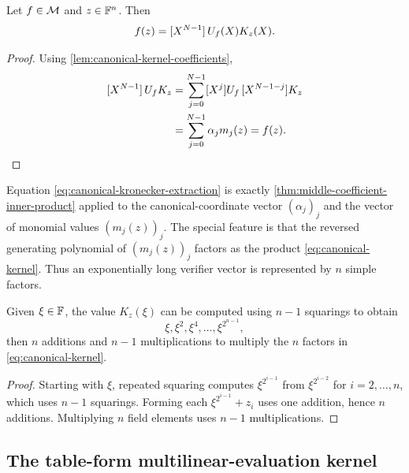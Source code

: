 \begin{theorem}
\label{thm:canonical-kronecker-extraction}
Let $f\in\mathcal{M}$ and $z\in\mathbb{F}^n$.  Then
\begin{equation}
  f(z)
  =[X^{N-1}]\,U_f(X)K_z(X).
  \label{eq:canonical-kronecker-extraction}
\end{equation}
\end{theorem}

\begin{proof}
Using \cref{lem:canonical-kernel-coefficients},
\begin{align*}
  [X^{N-1}]\,U_fK_z
  &=\sum_{j=0}^{N-1}[X^j]U_f\,[X^{N-1-j}]K_z\\
  &=\sum_{j=0}^{N-1}\alpha_jm_j(z)
   =f(z).
\end{align*}
\end{proof}

\begin{remark}
\label{rem:canonical-kernel-inner-product}
Equation \eqref{eq:canonical-kronecker-extraction} is exactly \cref{thm:middle-coefficient-inner-product} applied to the canonical-coordinate vector $(\alpha_j)_j$ and the vector of monomial values $(m_j(z))_j$.  The special feature is that the reversed generating polynomial of $(m_j(z))_j$ factors as the product \eqref{eq:canonical-kernel}.  Thus an exponentially long verifier vector is represented by $n$ simple factors.
\end{remark}

\begin{proposition}
\label{prop:canonical-kernel-cost}
Given $\xi\in\mathbb{F}$, the value $K_z(\xi)$ can be computed using $n-1$ squarings to obtain
\[
  \xi,\xi^2,\xi^4,\ldots,\xi^{2^{n-1}},
\]
then $n$ additions and $n-1$ multiplications to multiply the $n$ factors in \eqref{eq:canonical-kernel}.
\end{proposition}

\begin{proof}
Starting with $\xi$, repeated squaring computes $\xi^{2^{i-1}}$ from $\xi^{2^{i-2}}$ for $i=2,\ldots,n$, which uses $n-1$ squarings.  Forming each $\xi^{2^{i-1}}+z_i$ uses one addition, hence $n$ additions.  Multiplying $n$ field elements uses $n-1$ multiplications.
\end{proof}

\subsection{The table-form multilinear-evaluation kernel}
\label{sec:table-evaluation-kernel}

